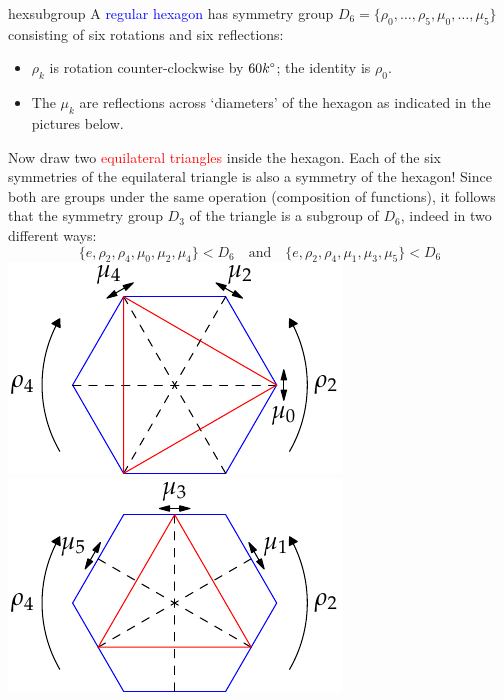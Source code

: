 \begin{example}[lower separated=false, sidebyside, sidebyside align=top seam, sidebyside gap=0pt, righthand width=0.33\linewidth]{}{hexsubgroup}
	A \textcolor{blue}{regular hexagon} has symmetry group $D_6=\{\rho_0,\ldots,\rho_5,\mu_0,\ldots,\mu_5\}$ consisting of six rotations and six reflections:
	\begin{itemize}
	  \item $\rho_k$ is rotation counter-clockwise by $\ang{60k}$; the identity is $\rho_0$.
	  \item The $\mu_k$ are reflections across `diameters' of the hexagon as indicated in the pictures below.
	\end{itemize}
	
	Now draw two \textcolor{red}{equilateral triangles} inside the hexagon.	Each of the six symmetries of the equilateral triangle is also a symmetry of the hexagon! Since both are groups under the same operation (composition of functions), it follows that the symmetry group $D_3$ of the triangle is a subgroup of $D_6$, indeed in two different ways:
	\[
		\{e,\rho_2,\rho_4,\mu_0,\mu_2,\mu_4\}< D_6\quad\text{and}\quad \{e,\rho_2,\rho_4,\mu_1,\mu_3,\mu_5\}< D_6
	\]
	\tcblower
	\flushright\includegraphics[scale=0.9]{group-hexagon1}\\
	\includegraphics[scale=0.9]{group-hexagon2}
\end{example}

